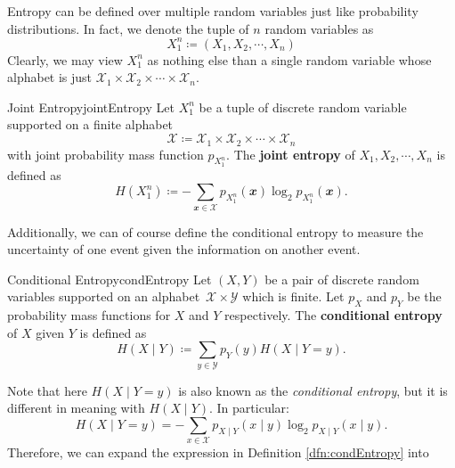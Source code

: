\documentclass[math]{amznotes}
\theoremstyle{remark}
\begin{document}
Entropy can be defined over multiple random variables just like probability distributions. In fact, we denote the tuple of $n$ random variables as 
\begin{equation*}
    X_{1}^{n} \coloneqq \left(X_1, X_2, \cdots, X_n\right)
\end{equation*}
Clearly, we may view $X_1^n$ as nothing else than a single random variable whose alphabet is just $\mathcal{X}_1 \times \mathcal{X}_2 \times \cdots \times \mathcal{X}_n$.
\begin{dfnbox}{Joint Entropy}{jointEntropy}
    Let $X_1^n$ be a tuple of discrete random variable supported on a finite alphabet 
    \begin{equation*}
        \mathcal{X} \coloneqq \mathcal{X}_1 \times \mathcal{X}_2 \times \cdots \times \mathcal{X}_n
    \end{equation*}
    with joint probability mass function $p_{X_1^n}$. The {\color{red} \textbf{joint entropy}} of $X_1, X_2, \cdots, X_n$ is defined as 
    \begin{equation*}
        H\left(X_1^n\right) \coloneqq -\sum_{\mathbfit{x} \in \mathcal{X}}p_{X_1^n}\left(\mathbfit{x}\right)\log_{2}p_{X_1^n}\left(\mathbfit{x}\right).
    \end{equation*}
\end{dfnbox}
Additionally, we can of course define the conditional entropy to measure the uncertainty of one event given the information on another event.
\begin{dfnbox}{Conditional Entropy}{condEntropy}
    Let $\left(X, Y\right)$ be a pair of discrete random variables supported on an alphabet~$\mathcal{X} \times \mathcal{Y}$ which is finite. Let $p_X$ and $p_Y$ be the probability mass functions for $X$ and $Y$ respectively. The {\color{red} \textbf{conditional entropy}} of $X$ given $Y$ is defined as 
    \begin{equation*}
        H\left(X \mid Y\right) \coloneqq \sum_{y \in \mathcal{Y}}p_Y\left(y\right)H\left(X \mid Y = y\right).
    \end{equation*}
\end{dfnbox}
Note that here $H\left(X \mid Y = y\right)$ is also known as the \textit{conditional entropy}, but it is different in meaning with $H\left(X \mid Y\right)$. In particular:
\begin{equation*}
    H\left(X \mid Y = y\right) = -\sum_{x \in \mathcal{X}}p_{X \mid Y}\left(x \mid y\right)\log_2p_{X \mid Y}\left(x \mid y\right).
\end{equation*}
Therefore, we can expand the expression in Definition \ref{dfn:condEntropy} into
\end{document}
